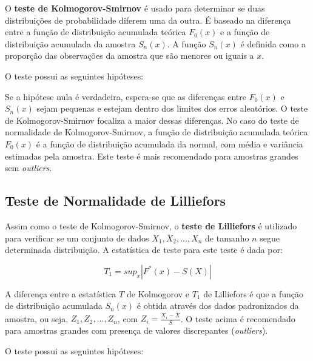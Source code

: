 \documentclass[
]{estat/estat}
\begin{document}
O \textbf{teste de Kolmogorov-Smirnov} é usado para determinar se duas
distribuições de probabilidade diferem uma da outra. É baseado na
diferença entre a função de distribuição acumulada teórica \(F_0(x)\) e
a função de distribuição acumulada da amostra \(S_n(x)\). A função
\(S_n(x)\) é definida como a proporção das observações da amostra que
são menores ou iguais a \(x\).

O teste possui as seguintes hipóteses:

\begin{center}
\end{center}

Se a hipótese nula é verdadeira, espera-se que as diferenças entre
\(F_0(x)\) e \(S_n(x)\) sejam pequenas e estejam dentro dos limites dos
erros aleatórios. O teste de Kolmogorov-Smirnov focaliza a maior dessas
diferenças. No caso do teste de normalidade de Kolmogorov-Smirnov, a
função de distribuição acumulada teórica \(F_0(x)\) é a função de
distribuição acumulada da normal, com média e variância estimadas pela
amostra. Este teste é mais recomendado para amostras grandes sem
\emph{outliers}.

\hypertarget{teste-de-normalidade-de-lilliefors}{%
\subsection{Teste de Normalidade de
Lilliefors}\label{teste-de-normalidade-de-lilliefors}}

Assim como o teste de Kolmogorov-Smirnov, o \textbf{teste de Lilliefors}
é utilizado para verificar se um conjunto de dados
\(X_1, X_2, ..., X_n\) de tamanho \(n\) segue determinada distribuição.
A estatística de teste para este teste é dada por:

\[ T_1 = sup_x |F^*(x) - S(X)| \]

A diferença entre a estatística \(T\) de Kolmogorov e \(T_1\) de
Lilliefors é que a função de distribuição acumulada \(S_n(x)\) é obtida
através dos dados padronizados da amostra, ou seja,
\(Z_1, Z_2, ..., Z_n\), com
\(Z_i = \displaystyle \frac{X_i - \bar{X}}{S}\). O teste acima é
recomendado para amostras grandes com presença de valores discrepantes
(\emph{outliers}).

O teste possui as seguintes hipóteses:

\begin{center}
\end{center}
\end{document}
